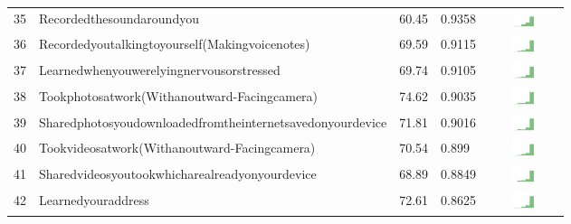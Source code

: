 \documentclass[a4paper,12pt]{article}
\begin{document}
\begin{longtable}{| p{0.5cm} | p{7cm} | p{1cm} |p{1cm} | c |}
35 & Recordedthesoundaroundyou & 60.45 & 0.9358&\includegraphics[width = 2cm, height = 0.5cm]{tables/recordedthesoundaroundyoucombined} \\ 
36 & Recordedyoutalkingtoyourself(Makingvoicenotes) & 69.59 & 0.9115&\includegraphics[width = 2cm, height = 0.5cm]{tables/recordedyoutalkingtoyourself(makingvoicenotes)combined} \\ 
37 & Learnedwhenyouwerelyingnervousorstressed & 69.74 & 0.9105&\includegraphics[width = 2cm, height = 0.5cm]{tables/learnedwhenyouwerelyingnervousorstressedcombined} \\ 
38 & Tookphotosatwork(Withanoutward-Facingcamera) & 74.62 & 0.9035&\includegraphics[width = 2cm, height = 0.5cm]{tables/tookphotosatwork(withanoutward-facingcamera)combined} \\ 
39 & Sharedphotosyoudownloadedfromtheinternetsavedonyourdevice & 71.81 & 0.9016&\includegraphics[width = 2cm, height = 0.5cm]{tables/sharedphotosyoudownloadedfromtheinternetsavedonyourdevicecombined} \\ 
40 & Tookvideosatwork(Withanoutward-Facingcamera) & 70.54 & 0.899&\includegraphics[width = 2cm, height = 0.5cm]{tables/tookvideosatwork(withanoutward-facingcamera)combined} \\ 
41 & Sharedvideosyoutookwhicharealreadyonyourdevice & 68.89 & 0.8849&\includegraphics[width = 2cm, height = 0.5cm]{tables/sharedvideosyoutookwhicharealreadyonyourdevicecombined} \\ 
42 & Learnedyouraddress & 72.61 & 0.8625&\includegraphics[width = 2cm, height = 0.5cm]{tables/learnedyouraddresscombined} \\ 

\end{longtable}
\end{document}
